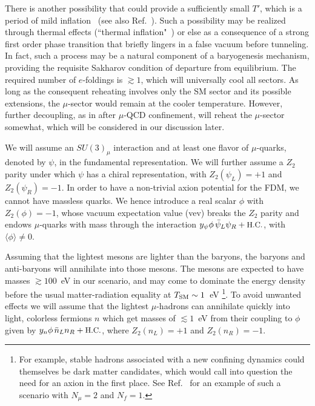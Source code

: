 \documentclass[twocolumn,preprintnumbers,
endnote,prl]{revtex4-1}
\newcommand{\vev}[1]{\langle {#1} \rangle}
\newcommand{\lsim}{\lesssim}
\newcommand{\gsim}{\gtrsim}
\newcommand{\tsm}{T_{\rm SM}}
\begin{document}
There is another possibility that 
could provide a sufficiently small $T'$, which is a period of mild inflation~\cite{Davoudiasl:2015vba} (see also Ref.~\cite{Carlson:1992fn}).  
Such a possibility may be realized through thermal effects (``thermal inflation"~\cite{Lyth:1995ka}) or else as a consequence of a strong first 
order phase transition that briefly lingers in a false vacuum before tunneling.  In fact, such a process may be a natural 
component of a baryogenesis mechanism, providing the requisite Sakharov condition of departure from equilibrium.  The required number of $e$-foldings is $\gsim 1$, which will universally cool all sectors.  As long as the consequent reheating 
involves only the SM sector and its possible extensions, the $\mu$-sector would remain at the cooler temperature.  However, 
further decoupling, as in after $\mu$-QCD confinement, will reheat the $\mu$-sector somewhat, which will be considered in our discussion later. 

We will assume an $SU(3)_\mu$ 
interaction and at least one flavor of $\mu$-quarks, denoted by $\psi$, in the fundamental representation.  We will 
further assume a $Z_2$ parity under which $\psi$ has a chiral representation, with  $Z_2(\psi_L) = +1$ and $Z_2(\psi_R) = -1$.  
In order to have a non-trivial axion potential for the FDM, we cannot have massless quarks.  We hence introduce 
a real scalar $\phi$ with $Z_2(\phi) = -1$, whose vacuum 
expectation value (vev) breaks the $Z_2$ parity and endows $\mu$-quarks 
with mass through the interaction $y_\psi \phi\, \bar \psi_L \psi_R + \text{\small H.C.}$, with $\vev{\phi} \neq 0$.

Assuming that the lightest mesons are lighter than the baryons, the baryons and anti-baryons will annihilate into those mesons. The mesons are expected to have masses $\gsim 100$~eV 
in our scenario, and 
may come to dominate the energy density before the usual matter-radiation equality at $\tsm \sim 1$~eV \footnote{For example, stable hadrons associated with a new confining dynamics could themselves be dark matter candidates, which would call into question the need for an axion in the first place. See Ref.~\cite{Francis:2016bzf} for an example of such a scenario with $N_{\mu} = 2$ and $N_f = 1$.}.  To avoid unwanted effects we will assume that the lightest $\mu$-hadrons can annihilate quickly 
into light, colorless fermions $n$ which get masses of $\lsim 1$~eV 
from their coupling to $\phi$ given by $y_n \phi \,\bar n_L n_R + \text{\small H.C.}$, where $Z_2(n_L) = +1$ and 
$Z_2(n_R)  = -1$. 
\end{document}
